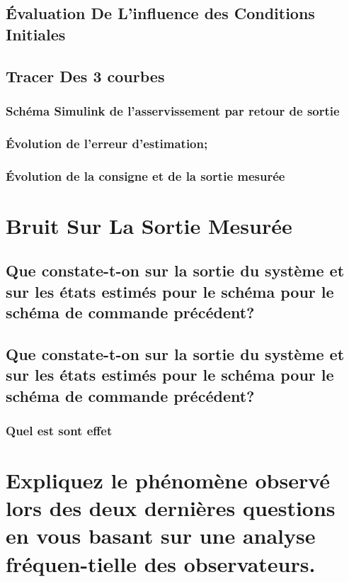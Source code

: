  
 \subsection{Évaluation De  L’influence des Conditions Initiales}
 
 
 \subsection{Tracer  Des 3 courbes}
  \subsubsection{Schéma Simulink de l’asservissement par retour de sortie}
  \subsubsection{Évolution de l’erreur d’estimation;}
  \subsubsection{Évolution de la consigne et de la sortie mesurée}
  
 \section{Bruit Sur La Sortie Mesurée}

  \subsection{Que constate-t-on sur la sortie du système et sur les états estimés pour le schéma pour le schéma de commande précédent?}
  \subsection{Que constate-t-on sur la sortie du système et sur les états estimés pour le schéma pour le schéma de commande précédent?}
   \subsubsection{Quel est sont effet } 
  
  \section{Expliquez le phénomène observé lors des deux dernières questions en vous basant sur une analyse fréquen-tielle des observateurs.} 